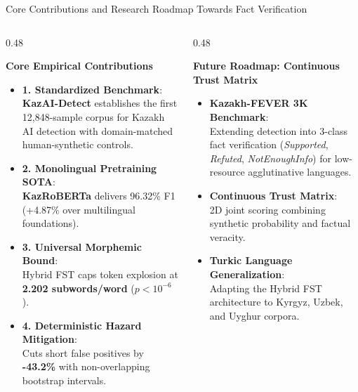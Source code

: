 \documentclass[aspectratio=169, 10pt]{beamer}
\newcommand{\subhead}[1]{{\normalsize\textbf{\color{DarkNavy}#1}\par\vspace{3pt}}}
\begin{document}
\begin{frame}{Core Contributions and Research Roadmap Towards Fact Verification}
    \begin{columns}[T]
        \begin{column}{0.48\textwidth}
            \subhead{Core Empirical Contributions}
            \vspace{2pt}
            \begin{itemize}\setlength{\itemsep}{3pt}\small
                \item \textbf{1. Standardized Benchmark}: \\
                {\footnotesize\textbf{KazAI-Detect} establishes the first 12,848-sample corpus for Kazakh AI detection with domain-matched human-synthetic controls.}
                \item \textbf{2. Monolingual Pretraining SOTA}: \\
                {\footnotesize\textbf{KazRoBERTa} delivers 96.32\% F1 (+4.87\% over multilingual foundations).}
                \item \textbf{3. Universal Morphemic Bound}: \\
                {\footnotesize Hybrid FST caps token explosion at \textbf{2.202 subwords/word} ($p < 10^{-6}$).}
                \item \textbf{4. Deterministic Hazard Mitigation}: \\
                {\footnotesize Cuts short false positives by \textbf{-43.2\%} with non-overlapping bootstrap intervals.}
            \end{itemize}
        \end{column}
        \begin{column}{0.48\textwidth}
            \subhead{Future Roadmap: Continuous Trust Matrix}
            \vspace{2pt}
            \begin{itemize}\setlength{\itemsep}{3pt}\small
                \item \textbf{Kazakh-FEVER 3K Benchmark}: \\
                {\footnotesize Extending detection into 3-class fact verification (\textit{Supported}, \textit{Refuted}, \textit{NotEnoughInfo}) for low-resource agglutinative languages.}
                \item \textbf{Continuous Trust Matrix}: \\
                {\footnotesize 2D joint scoring combining synthetic probability and factual veracity.}
                \item \textbf{Turkic Language Generalization}: \\
                {\footnotesize Adapting the Hybrid FST architecture to Kyrgyz, Uzbek, and Uyghur corpora.}
            \end{itemize}
        \end{column}
    \end{columns}
\end{frame}
\end{document}
